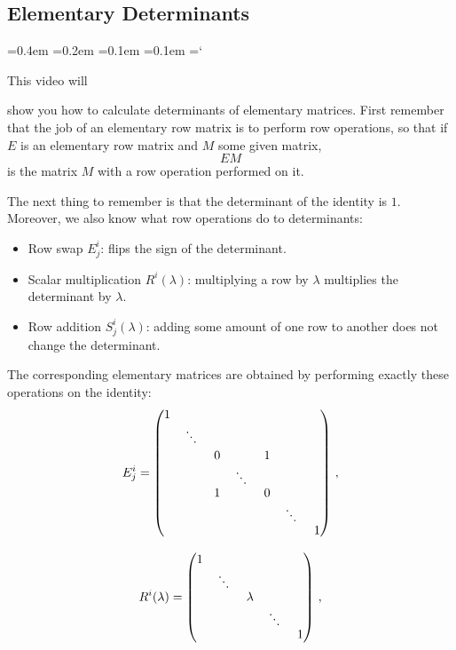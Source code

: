 
\subsection*{Elementary Determinants}

{\ttfamily
{}\font=0.4em
\font=0.2em
\font=0.1em
\font=0.1em
\hyphenchar\font=`\-


\hypertarget{scripts_elementary_matrices_determinants_ii_dets}{This video will}
show you how to calculate determinants of elementary matrices.
First remember that the job of an elementary row matrix is to perform row operations, 
so that if $E$ is an elementary row matrix and $M$ some given matrix,
$$EM$$
is the matrix $M$ with a row operation performed on it. 

The next thing to remember is that the determinant of the identity is $1$.
Moreover, we also know what row operations do to determinants:
\begin{itemize} 
\item Row swap $E^i_j$: flips the sign of the determinant.
\item Scalar multiplication $R^i(\lambda)$: multiplying a row by $\lambda$ multiplies the determinant by $\lambda$.
\item Row addition $S^i_j(\lambda)$: adding some amount of one row to another does not change the determinant.
\end{itemize}
The corresponding elementary matrices are obtained by performing exactly these operations on the identity:
$$
E^i_j=\begin{pmatrix}
1 & & & & & & \\
& \rotatebox{-15}{$\ddots$} & & & & & \\[1mm]
& & 0 & & 1 & & \\
& & & \rotatebox{-15}{$\ddots$} & & & \\
& & 1 & & 0 & & \\
& & & & & \rotatebox{-15}{$\ddots$}& \\
& & & & & & 1 \\
\end{pmatrix}\, ,
$$

$$
R^i(\lambda)=
\begin{pmatrix}
1 & & & & \\
  & \rotatebox{-15}{$\ddots$} & & & \\
  & & \lambda & & \\
  & & & \rotatebox{-15}{$\ddots$} & \\
  & & & & 1 \\
\end{pmatrix}
\, ,$$

}
